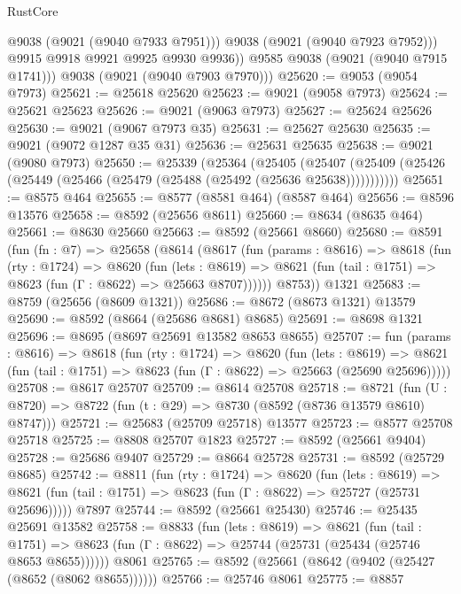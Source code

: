 \begin{lexlean}{RustCore}
\begin{coremodule}
                @9038
                (@9021 (@9040 @7933 @7951)))
              @9038
              (@9021 (@9040 @7923 @7952)))
            @9915
            @9918
            @9921
            @9925
            @9930
            @9936))
        @9585
        @9038
        (@9021 (@9040 @7915 @1741)))
      @9038
      (@9021 (@9040 @7903 @7970)))
@25620 := @9053 (@9054 @7973)
@25621 := @25618 @25620
@25623 := @9021 (@9058 @7973)
@25624 := @25621 @25623
@25626 := @9021 (@9063 @7973)
@25627 := @25624 @25626
@25630 := @9021 (@9067 @7973 @35)
@25631 := @25627 @25630
@25635 := @9021 (@9072 @1287 @35 @31)
@25636 := @25631 @25635
@25638 := @9021 (@9080 @7973)
@25650 := @25339
    (@25364
      (@25405
        (@25407 (@25409 (@25426 (@25449 (@25466 (@25479 (@25488 (@25492 (@25636 @25638)))))))))))
@25651 := @8575 @464
@25655 := @8577 (@8581 @464) (@8587 @464)
@25656 := @8596 @13576
@25658 := @8592 (@25656 @8611)
@25660 := @8634 (@8635 @464)
@25661 := @8630 @25660
@25663 := @8592 (@25661 @8660)
@25680 := @8591
    (fun (fn : @7) =>
    @25658
      (@8614
        (@8617
          (fun (params : @8616) =>
          @8618
            (fun (rty : @1724) =>
            @8620
              (fun (lets : @8619) =>
              @8621 (fun (tail : @1751) => @8623 (fun (Γ : @8622) => @25663 @8707))))))
        @8753))
    @1321
@25683 := @8759 (@25656 (@8609 @1321))
@25686 := @8672 (@8673 @1321) @13579
@25690 := @8592 (@8664 (@25686 @8681) @8685)
@25691 := @8698 @1321
@25696 := @8695 (@8697 @25691 @13582 @8653 @8655)
@25707 := fun (params : @8616) =>
  @8618
    (fun (rty : @1724) =>
    @8620
      (fun (lets : @8619) =>
      @8621 (fun (tail : @1751) => @8623 (fun (Γ : @8622) => @25663 (@25690 @25696)))))
@25708 := @8617 @25707
@25709 := @8614 @25708
@25718 := @8721
    (fun (U : @8720) => @8722 (fun (t : @29) => @8730 (@8592 (@8736 @13579 @8610) @8747)))
@25721 := @25683 (@25709 @25718) @13577
@25723 := @8577 @25708 @25718
@25725 := @8808 @25707 @1823
@25727 := @8592 (@25661 @9404)
@25728 := @25686 @9407
@25729 := @8664 @25728
@25731 := @8592 (@25729 @8685)
@25742 := @8811
    (fun (rty : @1724) =>
    @8620
      (fun (lets : @8619) =>
      @8621 (fun (tail : @1751) => @8623 (fun (Γ : @8622) => @25727 (@25731 @25696)))))
    @7897
@25744 := @8592 (@25661 @25430)
@25746 := @25435 @25691 @13582
@25758 := @8833
    (fun (lets : @8619) =>
    @8621
      (fun (tail : @1751) =>
      @8623 (fun (Γ : @8622) => @25744 (@25731 (@25434 (@25746 @8653 @8655))))))
    @8061
@25765 := @8592 (@25661 (@8642 (@9402 (@25427 (@8652 (@8062 @8655))))))
@25766 := @25746 @8061
@25775 := @8857

\end{coremodule}
\end{lexlean}
